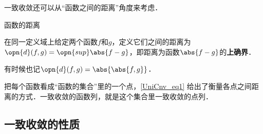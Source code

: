 一致收敛还可以从“函数之间的距离”角度来考虑．

\begin{definition}{函数的距离}\label{UniCnv_def1}

在同一定义域上给定两个函数$f$和$g$，定义它们之间的距离为$\opn{d}(f, g)=\opn{sup}\abs{f-g}$，即距离为函数$\abs{f-g}$的\textbf{上确界}．

有时候也记$\opn{d}(f, g)=\abs{\abs{f, g}}$．

\end{definition}

把每个函数看成“函数的集合”里的一个点，\autoref{UniCnv_eq1} 给出了衡量各点之间距离的方式．一致收敛的函数列，就是这个集合里一致收敛的点列．


\subsection{一致收敛的性质}























